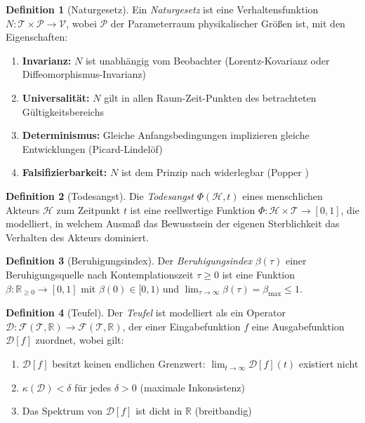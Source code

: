 ﻿\documentclass[a4paper,12pt]{article}
\theoremstyle{definition}
\newtheorem{definition}{Definition}
\begin{document}
\begin{definition}[Naturgesetz]
Ein \emph{Naturgesetz} ist eine Verhaltensfunktion $N: \mathcal{T} \times \mathcal{P} \to \mathcal{V}$, wobei $\mathcal{P}$ der Parameterraum physikalischer Größen ist, mit den Eigenschaften:
\begin{enumerate}
\item \textbf{Invarianz:} $N$ ist unabhängig vom Beobachter (Lorentz-Kovarianz oder Diffeomorphismus-Invarianz)
\item \textbf{Universalität:} $N$ gilt in allen Raum-Zeit-Punkten des betrachteten Gültigkeitsbereichs
\item \textbf{Determinismus:} Gleiche Anfangsbedingungen implizieren gleiche Entwicklungen (Picard-Lindelöf)
\item \textbf{Falsifizierbarkeit:} $N$ ist dem Prinzip nach widerlegbar (Popper \cite{popper1934})
\end{enumerate}
\end{definition}

\begin{definition}[Todesangst]
Die \emph{Todesangst} $\Phi(\mathcal{H}, t)$ eines menschlichen Akteurs $\mathcal{H}$ zum Zeitpunkt $t$ ist eine reellwertige Funktion $\Phi: \mathcal{H} \times \mathcal{T} \to [0,1]$, die modelliert, in welchem Ausmaß das Bewusstsein der eigenen Sterblichkeit das Verhalten des Akteurs dominiert.
\end{definition}

\begin{definition}[Beruhigungsindex]
Der \emph{Beruhigungsindex} $\beta(\tau)$ einer Beruhigungsquelle nach Kontemplationszeit $\tau \geq 0$ ist eine Funktion $\beta: \mathbb{R}_{\geq 0} \to [0,1]$ mit $\beta(0) \in [0,1)$ und $\lim_{\tau \to \infty} \beta(\tau) = \beta_{\max} \leq 1$.
\end{definition}

\begin{definition}[Teufel]
\label{def:teufel}
Der \emph{Teufel} ist modelliert als ein Operator $\mathcal{D}: \mathcal{F}(\mathcal{T}, \mathbb{R}) \to \mathcal{F}(\mathcal{T}, \mathbb{R})$, der einer Eingabefunktion $f$ eine Ausgabefunktion $\mathcal{D}[f]$ zuordnet, wobei gilt:
\begin{enumerate}
\item $\mathcal{D}[f]$ besitzt keinen endlichen Grenzwert: $\lim_{t \to \infty} \mathcal{D}[f](t)$ existiert nicht
\item $\kappa(\mathcal{D}) < \delta$ für jedes $\delta > 0$ (maximale Inkonsistenz)
\item Das Spektrum von $\mathcal{D}[f]$ ist dicht in $\mathbb{R}$ (breitbandig)
\end{enumerate}
\end{definition}
\end{document}
